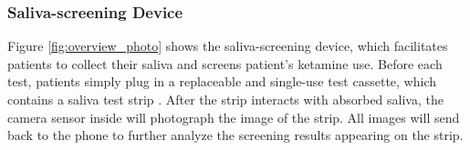 \subsubsection{Saliva-screening Device}
Figure \ref{fig:overview_photo} shows the saliva-screening device, which facilitates patients to collect their saliva and screens patient's ketamine use. Before each test, patients simply plug in a replaceable and single-use test cassette, which contains a saliva test strip \cite{saliva_test_cassette}.  After the strip interacts with absorbed saliva, the camera sensor inside will photograph the image of the strip. All images will send back to the phone to further analyze the screening results appearing on the strip.


